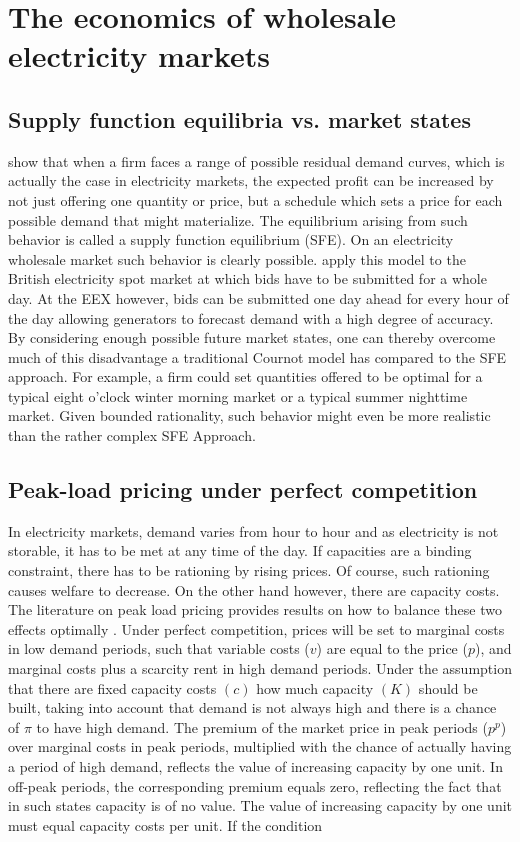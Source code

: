 \section{The economics of wholesale electricity markets} \label{sect:3}

\subsection{Supply function equilibria vs. market states}

\cite{Klemperer1989} show that when a firm faces a range of possible residual demand curves, which is actually the case in electricity markets, the expected profit can be increased by not just offering one quantity or price, but a schedule which sets a price for each possible demand that might materialize. The equilibrium arising from such behavior is called a supply function equilibrium (SFE). On an electricity wholesale market such behavior is clearly possible. \cite{Green1992} apply this model to the British electricity spot market at which bids have to be submitted for a whole day. At the EEX however, bids can be submitted one day ahead for every hour of the day allowing generators to forecast demand with a high degree of accuracy. By considering enough possible future market states, one can thereby overcome much of this disadvantage a traditional Cournot model has compared to the SFE approach. For example, a firm could set quantities offered to be optimal for a typical eight o'clock winter morning market or a typical summer nighttime market. Given bounded rationality, such behavior might even be more realistic than the rather complex SFE Approach.

\subsection{Peak-load pricing under perfect competition}

In electricity markets, demand varies from hour to hour and as electricity is not storable, it has to be met at any time of the day. If capacities are a binding constraint, there has to be rationing by rising prices. Of course, such rationing causes welfare to decrease. On the other hand however, there are capacity costs. The literature on peak load pricing provides results on how to balance these two effects optimally \citep[see][]{Crew1986}. Under perfect competition, prices will be set to marginal costs in low demand periods, such that variable costs ($v$) are equal to the price ($p$), and marginal costs plus a scarcity rent in high demand periods. Under the assumption that there are fixed capacity costs $(c)$ how much capacity $(K)$ should be built, taking into account that demand is not always high and there is a chance of $\pi$ to have high demand. The premium of the market price in peak periods ($p^p$) over marginal costs in peak periods, multiplied with the chance of actually having a period of high demand, reflects the value of increasing capacity by one unit. In off-peak periods, the corresponding premium equals zero, reflecting the fact that in such states capacity is of no value. The value of increasing capacity by one unit must equal capacity costs per unit. If the condition

